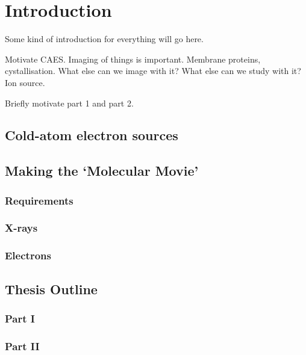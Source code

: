  \chapter{Introduction}
 
\setcounter{page}{1}

Some kind of introduction for everything will go here.

Motivate CAES. Imaging of things is important. Membrane proteins, cystallisation. What else can we image with it? What else can we study with it? Ion source.

Briefly motivate part 1 and part 2.

\section{Cold-atom electron sources}

\section{Making the `Molecular Movie'}

\subsection{Requirements}

\subsection{X-rays}

\subsection{Electrons}

\section{Thesis Outline}

\subsection{Part I}

\subsection{Part II}
